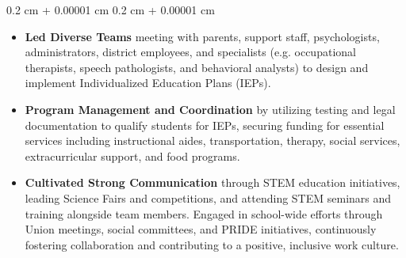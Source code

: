 \documentclass[10pt, letterpaper]{article}
\newenvironment{highlights}{
    \begin{itemize}[
        topsep=0.10 cm,
        parsep=0.10 cm,
        partopsep=0pt,
        itemsep=0pt,
        leftmargin=0.4 cm + 10pt
    ]
}{
    \end{itemize}
} %
\newenvironment{onecolentry}{
    \begin{adjustwidth}{
        0.2 cm + 0.00001 cm
    }{
        0.2 cm + 0.00001 cm
    }
}{
    \end{adjustwidth}
} %
\begin{document}
        \vspace{0.10 cm}
        \begin{onecolentry}
            \begin{highlights}
                \item \textbf{Led Diverse Teams} meeting with parents, support staff, psychologists, administrators, district employees, and specialists (e.g. occupational therapists, speech pathologists, and behavioral analysts) to design and implement Individualized Education Plans (IEPs).
                \item \textbf{Program Management and Coordination} by utilizing testing and legal documentation to qualify students for IEPs, securing funding for essential services including instructional aides, transportation, therapy, social services, extracurricular support, and food programs.
                \item \textbf{Cultivated Strong Communication} through STEM education initiatives, leading Science Fairs and competitions, and attending STEM seminars and training alongside team members. Engaged in school-wide efforts through Union meetings, social committees, and PRIDE initiatives, continuously fostering collaboration and contributing to a positive, inclusive work culture.
            \end{highlights}
        \end{onecolentry}
            
       
\end{document}
